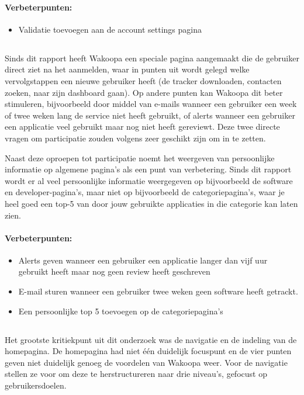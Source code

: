 \documentclass[a4paper, 10pt, pdftex]{report}
\begin{document}
      \paragraph{\textbf{Verbeterpunten:}}
      \begin{itemize}
        \item Validatie toevoegen aan de account settings pagina
      \end{itemize}

    \subsection{\cite{Alfrink2008}}
    Sinds dit rapport heeft Wakoopa een speciale pagina aangemaakt die de gebruiker direct ziet na het aanmelden, waar in punten uit wordt gelegd welke vervolgstappen een nieuwe gebruiker heeft (de tracker downloaden, contacten zoeken, naar zijn dashboard gaan). Op andere punten kan Wakoopa dit beter stimuleren, bijvoorbeeld door middel van e-mails wanneer een gebruiker een week of twee weken lang de service niet heeft gebruikt, of alerts wanneer een gebruiker een applicatie veel gebruikt maar nog niet heeft gereviewt. Deze twee directe vragen om participatie zouden volgens \citeauthor{Alfrink2008} zeer geschikt zijn om in te zetten.

    Naast deze oproepen tot participatie noemt \citeauthor{Alfrink2008} het weergeven van persoonlijke informatie op algemene pagina's als een punt van verbetering. Sinds dit rapport wordt er al veel persoonlijke informatie weergegeven op bijvoorbeeld de software en developer-pagina's, maar niet op bijvoorbeeld de categoriepagina's, waar je heel goed een top-5 van door jouw gebruikte applicaties in die categorie kan laten zien.
    \paragraph{\textbf{Verbeterpunten:}}
      \begin{itemize}
        \item Alerts geven wanneer een gebruiker een applicatie langer dan vijf uur gebruikt heeft maar nog geen review heeft geschreven
        \item E-mail sturen wanneer een gebruiker twee weken geen software heeft getrackt.
        \item Een persoonlijke top 5 toevoegen op de categoriepagina's
      \end{itemize}

    \subsection{\cite{Hoekman2008}}
    Het grootste kritiekpunt uit dit onderzoek was de navigatie en de indeling van de homepagina. De homepagina had niet \'e\'en duidelijk focuspunt en de vier punten geven niet duidelijk genoeg de voordelen van Wakoopa weer. Voor de navigatie stellen ze voor om deze te herstructureren naar drie niveau's, gefocust op gebruikersdoelen.
\end{document}
